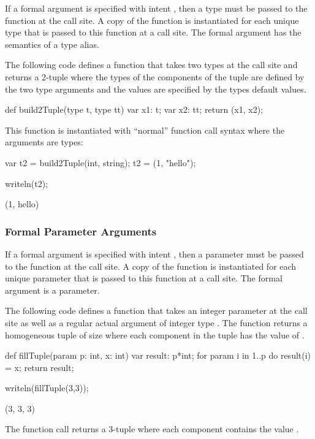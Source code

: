 If a formal argument is specified with intent , then a type
must be passed to the function at the call site.  A copy of the
function is instantiated for each unique type that is passed to this
function at a call site.  The formal argument has the semantics of a
type alias.
\begin{example}
The following code defines a function that takes two types at the call
site and returns a 2-tuple where the types of the components of the
tuple are defined by the two type arguments and the values are
specified by the types default values.
\begin{chapelpre}
\end{chapelpre}
\begin{chapel}
def build2Tuple(type t, type tt) {
  var x1: t;
  var x2: tt;
  return (x1, x2);
}
\end{chapel}
This function is instantiated with ``normal'' function call syntax
where the arguments are types:
\begin{chapel}
var t2 = build2Tuple(int, string);
t2 = (1, "hello");
\end{chapel}
\begin{chapelpost}
writeln(t2);
\end{chapelpost}
\begin{chapeloutput}
(1, hello)
\end{chapeloutput}
\end{example}

\subsubsection{Formal Parameter Arguments}
\label{Formal_Parameter_Arguments}

If a formal argument is specified with intent , then a
parameter must be passed to the function at the call site.  A copy of
the function is instantiated for each unique parameter that is passed
to this function at a call site.  The formal argument is a parameter.
\begin{example}
The following code defines a function that takes an integer parameter
 at the call site as well as a regular actual argument of
integer type .  The function returns a homogeneous tuple of
size  where each component in the tuple has the value of
.
\begin{chapelpre}
\end{chapelpre}
\begin{chapel}
def fillTuple(param p: int, x: int) {
  var result: p*int;
  for param i in 1..p do
    result(i) = x;
  return result;
}
\end{chapel}
\begin{chapelpost}
writeln(fillTuple(3,3));
\end{chapelpost}
\begin{chapeloutput}
(3, 3, 3)
\end{chapeloutput}
The function call  returns a 3-tuple where each
component contains the value .
\end{example}

